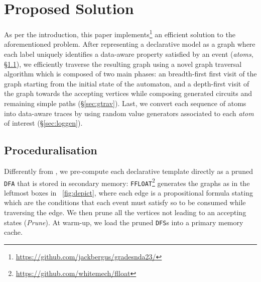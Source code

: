 \documentclass[sigconf]{acmart}
\begin{document}
\section{Proposed Solution}\label{sec:algo}
As per the introduction, this paper implements\footnote{\url{https://github.com/jackbergus/gradesnda23/}}  an efficient solution to the aforementioned problem. After representing a declarative model as a graph where each label uniquely identifies a data-aware property satisfied by an event (\textit{atoms}, \S\ref{sec:ODFAgen}), we efficiently traverse the resulting graph using a novel graph traversal algorithm which is composed of two main phases: an breadth-first first visit of the graph starting from the initial state of the automaton, and a depth-first visit of the graph towards the accepting vertices while composing generated circuits and remaining simple paths (\S\ref{sec:gtrav}). Last, we convert each sequence of atoms into data-aware traces by using random value generators associated to each \textit{atom} of interest (\S\ref{sec:loggen}).




\subsection{Proceduralisation}\label{sec:ODFAgen}
Differently from \cite{DBLP:conf/caise/CiccioBCM15}, we pre-compute each declarative template directly as a pruned \texttt{DFA} that is stored in secondary memory: \texttt{FFLOAT}\footnote{\url{https://github.com/whitemech/flloat}} \cite{FLLOAT1}  generates the graphs as in the leftmost boxes in \figurename~\ref{fig:depict}, where each edge is a propositional formula stating which are the conditions that each event must satisfy so to be consumed while traversing the edge. We then prune all the vertices not leading to an accepting states (\textit{Prune}). At warm-up, we load the pruned \texttt{DFS}s into a primary memory cache. 
\end{document}
